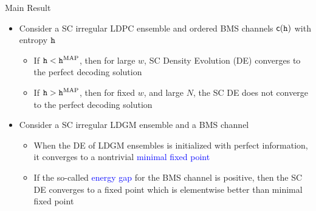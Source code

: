 \documentclass{beamer}
\newlength{\onecolwid}
\begin{document}
\begin{columns}[t]
\begin{column}{\onecolwid}
\begin{block}{\Large Main Result}
\begin{itemize}
  \item Consider a SC irregular LDPC ensemble and ordered BMS channels $\mathsf{c}(\texttt{h})$ with entropy $\texttt{h}$ 
    \begin{itemize}
    \item If $\texttt{h} < \texttt{h}^{\mathrm{MAP}}$, then for large $w$, SC Density Evolution (DE) converges to the perfect decoding solution
    \item If $\texttt{h} > \texttt{h}^{\mathrm{MAP}}$, then for fixed $w$, and large $N$, the SC DE does not converge to the perfect decoding solution
    \end{itemize}
    \vspace{0.5cm}
  \item Consider a SC irregular LDGM ensemble and a BMS channel
    \begin{itemize}
    \item When the DE of LDGM ensembles is initialized with perfect information, it converges to a nontrivial \textcolor{blue}{minimal fixed point}
    \item If the so-called \textcolor{blue}{energy gap} for the BMS channel is positive, then the SC DE converges to a fixed point which is elementwise better than minimal fixed point
    \end{itemize}
  \end{itemize}
\end{block}


\end{column}
\end{columns}
\end{document}
